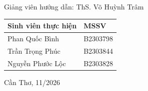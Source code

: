 \begin{titlepage}
    \begin{center}
        Giảng viên hướng dẫn: ThS. Võ Huỳnh Trâm\\[14pt]
        
        \setlength{\extrarowheight}{4pt}
        \begin{tabular}{|p{5.5cm}|p{3.5cm}|}
            \hline
            \hfil\normalsize\textbf{Sinh viên thực hiện}\hfil & \hfil\normalsize\textbf{MSSV}\hfil \\[2pt] \hline
            Phan Quốc Bình & B2303798 \\[2pt] \hline
            Trần Trọng Phúc & B2303844 \\[2pt] \hline
            Nguyễn Phước Lộc & B2303828 \\[2pt] \hline
        \end{tabular}
    \end{center}

    \vfill 

    Cần Thơ, 11/2026

    \vspace{0.8cm}

\end{titlepage}